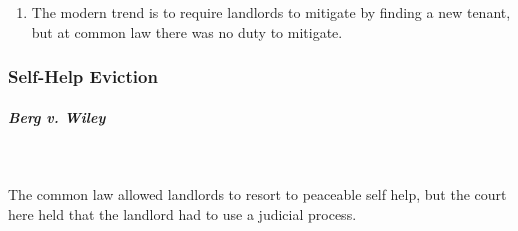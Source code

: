 \begin{enumerate}
    \item The modern trend is to require landlords to mitigate by finding a 
    new tenant, but at common law there was no duty to mitigate.
\end{enumerate}

\subsubsection{Self-Help Eviction} %

\paragraph{\emph{Berg v. Wiley}}
~\\\\
The common law allowed landlords to resort to peaceable self help, but the 
court here held that the landlord had to use a judicial process.

